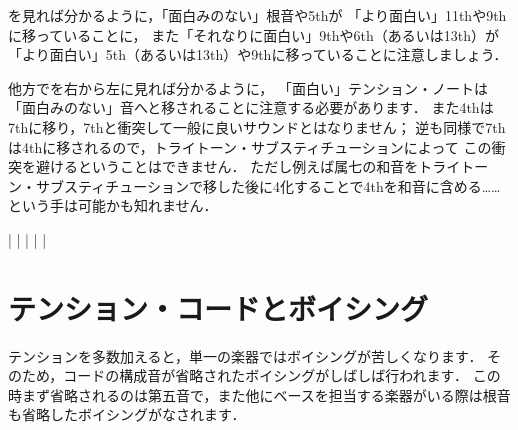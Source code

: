 \documentclass[dvipdfmx,uplatex,b5paper,openany,jbase=12Q,nomag*,textwidth-limit=44%
               ]{gachimuchi}[2020/05/05]
\begin{document}
を見れば分かるように，「面白みのない」根音や5thが
「より面白い」\bSharp11thや\bFlat9thに移っていることに，
また「それなりに面白い」\bNatural9thや\bNatural6th（あるいは\bNatural13th）が
「より面白い」\bSharp5th（あるいは\bFlat13th）や\bSharp9thに移っていることに注意しましょう．

他方でを右から左に見れば分かるように，
「面白い」テンション・ノートは「面白みのない」音へと移されることに注意する必要があります．
また4thは\bNatural7thに移り，\bFlat7thと衝突して一般に良いサウンドとはなりません；
逆も同様で\bNatural7thは4thに移されるので，トライトーン・サブスティチューションによって
この衝突を避けるということはできません．
ただし例えば属七の和音をトライトーン・サブスティチューションで移した後に\Sus4化することで4thを和音に含める……
という手は可能かも知れません．
\begin{Music}
  \nostartrule%
  \Startpiece
  \Notes%
  |%
  \en\bar
  \Notes%
  |%
  \en\bar
  \Notes%
  |%
  \en
  \endpiece
\end{Music}



\section{テンション・コードとボイシング}
テンションを多数加えると，単一の楽器ではボイシングが苦しくなります．
そのため，コードの構成音が省略されたボイシングがしばしば行われます．
この時まず省略されるのは第五音で，また他にベースを担当する楽器がいる際は根音も省略したボイシングがなされます．
\end{document}

